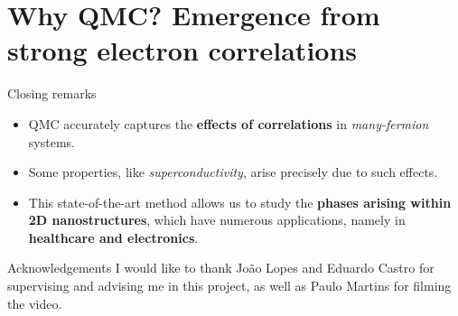\documentclass{beamer}
\begin{document}
  \section{Why QMC? Emergence from strong electron correlations}
  \begin{frame}{Closing remarks}
  	\begin{itemize}
  	\item QMC accurately captures the \textbf{effects of correlations} in \emph{many-fermion} systems.
  	\item Some properties, like \emph{superconductivity}, arise precisely due to such effects.
  	\item This state-of-the-art method allows us to study the \textbf{phases arising within 2D nanostructures}, which have numerous applications, namely in \textbf{healthcare and electronics}.
  	\end{itemize}
  \end{frame}
  \begin{frame}{Acknowledgements}
  	I would like to thank Jo\~ao Lopes and Eduardo Castro for supervising and advising me in this project, as well as Paulo Martins for filming the video.

	\end{frame}
\end{document}
